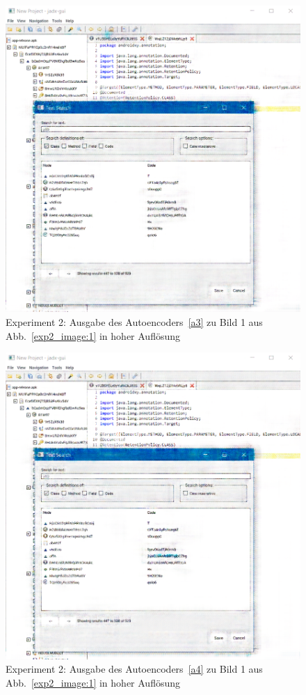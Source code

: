 \begin{figure} [ht]
  \centering
  \includegraphics[width=\textwidth]{bilder/result_exp2/0_pred_a3.png}

  \caption{Experiment 2: Ausgabe des Autoencoders~\ref{a3} zu Bild 1 aus Abb.~\ref{exp2_image:1} in hoher Auflösung}
\end{figure}

\begin{figure} [ht]
  \centering
  \includegraphics[width=\textwidth]{bilder/result_exp2/0_pred_a4.png}

  \caption{Experiment 2: Ausgabe des Autoencoders~\ref{a4} zu Bild 1 aus Abb.~\ref{exp2_image:1} in hoher Auflösung}
\end{figure}


